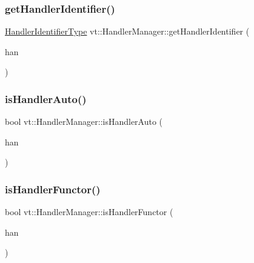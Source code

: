 \subsubsection{\texorpdfstring{get\+Handler\+Identifier()}{getHandlerIdentifier()}}
{\footnotesize\ttfamily \hyperlink{namespacevt_a59ae068fe828d1c33051ff96f3d016b6}{Handler\+Identifier\+Type} vt\+::\+Handler\+Manager\+::get\+Handler\+Identifier (\begin{DoxyParamCaption}\item[{\hyperlink{namespacevt_af64846b57dfcaf104da3ef6967917573}{Handler\+Type}}]{han }\end{DoxyParamCaption})\hspace{0.3cm}{\ttfamily [static]}}

\mbox{\label{structvt_1_1_handler_manager_a3324aeb71747bdd6b99194674dc03434}} 
\subsubsection{\texorpdfstring{is\+Handler\+Auto()}{isHandlerAuto()}}
{\footnotesize\ttfamily bool vt\+::\+Handler\+Manager\+::is\+Handler\+Auto (\begin{DoxyParamCaption}\item[{\hyperlink{namespacevt_af64846b57dfcaf104da3ef6967917573}{Handler\+Type}}]{han }\end{DoxyParamCaption})\hspace{0.3cm}{\ttfamily [static]}}

\mbox{\label{structvt_1_1_handler_manager_a0d03f576b15390773522317a4086e725}} 
\subsubsection{\texorpdfstring{is\+Handler\+Functor()}{isHandlerFunctor()}}
{\footnotesize\ttfamily bool vt\+::\+Handler\+Manager\+::is\+Handler\+Functor (\begin{DoxyParamCaption}\item[{\hyperlink{namespacevt_af64846b57dfcaf104da3ef6967917573}{Handler\+Type}}]{han }\end{DoxyParamCaption})\hspace{0.3cm}{\ttfamily [static]}}

